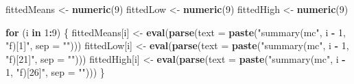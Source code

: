 \documentclass[10pt,]{scrartcl}
\newenvironment{Shaded}{\begin{snugshade}}{\end{snugshade}}
\newcommand{\KeywordTok}[1]{\textcolor[rgb]{0.13,0.29,0.53}{\textbf{#1}}}
\newcommand{\DataTypeTok}[1]{\textcolor[rgb]{0.13,0.29,0.53}{#1}}
\newcommand{\DecValTok}[1]{\textcolor[rgb]{0.00,0.00,0.81}{#1}}
\newcommand{\StringTok}[1]{\textcolor[rgb]{0.31,0.60,0.02}{#1}}
\newcommand{\ControlFlowTok}[1]{\textcolor[rgb]{0.13,0.29,0.53}{\textbf{#1}}}
\newcommand{\OperatorTok}[1]{\textcolor[rgb]{0.81,0.36,0.00}{\textbf{#1}}}
\newcommand{\NormalTok}[1]{#1}
\begin{document}
\begin{Shaded}
\begin{Highlighting}[]
\NormalTok{fittedMeans <-}\StringTok{ }\KeywordTok{numeric}\NormalTok{(}\DecValTok{9}\NormalTok{)}
\NormalTok{fittedLow <-}\StringTok{ }\KeywordTok{numeric}\NormalTok{(}\DecValTok{9}\NormalTok{)}
\NormalTok{fittedHigh <-}\StringTok{ }\KeywordTok{numeric}\NormalTok{(}\DecValTok{9}\NormalTok{)}

\ControlFlowTok{for}\NormalTok{ (i }\ControlFlowTok{in} \DecValTok{1}\OperatorTok{:}\DecValTok{9}\NormalTok{) \{}
\NormalTok{    fittedMeans[i] <-}\StringTok{ }\KeywordTok{eval}\NormalTok{(}\KeywordTok{parse}\NormalTok{(}\DataTypeTok{text =} \KeywordTok{paste}\NormalTok{(}\StringTok{"summary(mc"}\NormalTok{, i }\OperatorTok{-}
\StringTok{        }\DecValTok{1}\NormalTok{, }\StringTok{"f)[1]"}\NormalTok{, }\DataTypeTok{sep =} \StringTok{""}\NormalTok{)))}
\NormalTok{    fittedLow[i] <-}\StringTok{ }\KeywordTok{eval}\NormalTok{(}\KeywordTok{parse}\NormalTok{(}\DataTypeTok{text =} \KeywordTok{paste}\NormalTok{(}\StringTok{"summary(mc"}\NormalTok{, i }\OperatorTok{-}
\StringTok{        }\DecValTok{1}\NormalTok{, }\StringTok{"f)[21]"}\NormalTok{, }\DataTypeTok{sep =} \StringTok{""}\NormalTok{)))}
\NormalTok{    fittedHigh[i] <-}\StringTok{ }\KeywordTok{eval}\NormalTok{(}\KeywordTok{parse}\NormalTok{(}\DataTypeTok{text =} \KeywordTok{paste}\NormalTok{(}\StringTok{"summary(mc"}\NormalTok{, i }\OperatorTok{-}
\StringTok{        }\DecValTok{1}\NormalTok{, }\StringTok{"f)[26]"}\NormalTok{, }\DataTypeTok{sep =} \StringTok{""}\NormalTok{)))}
\NormalTok{\}}


\end{Highlighting}
\end{Shaded}
\end{document}
